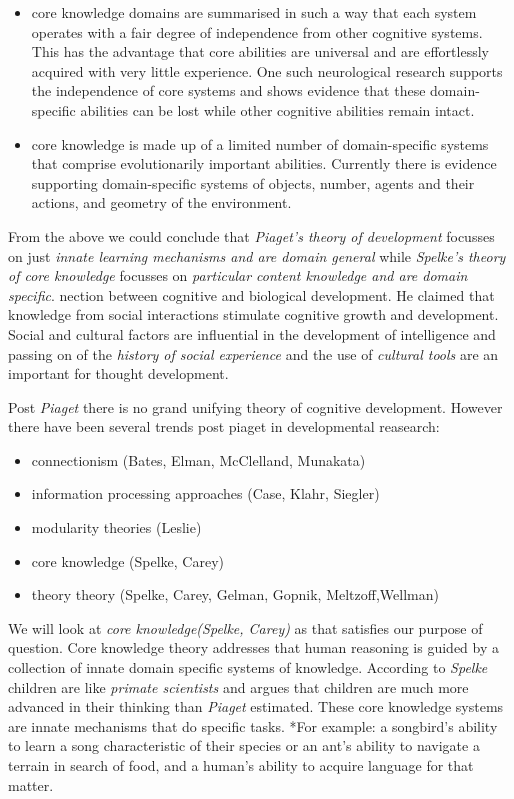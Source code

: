 \documentclass[11pt]{article}
\providecommand{\tightlist}{%
      \setlength{\itemsep}{0pt}\setlength{\parskip}{0pt}}
\begin{document}
\begin{itemize}
\item
  core knowledge domains are summarised in such a way that each system
  operates with a fair degree of independence from other cognitive
  systems. This has the advantage that core abilities are universal and
  are effortlessly acquired with very little experience. One such
  neurological research supports the independence of core systems and
  shows evidence that these domain-specific abilities can be lost while
  other cognitive abilities remain intact.
\item
  core knowledge is made up of a limited number of domain-specific
  systems that comprise evolutionarily important abilities. Currently
  there is evidence supporting domain-specific systems of objects,
  number, agents and their actions, and geometry of the environment.
\end{itemize}

From the above we could conclude that \emph{Piaget's theory of
development} focusses on just \emph{innate learning mechanisms and are
domain general} while \emph{Spelke's theory of core knowledge} focusses
on \emph{particular content knowledge and are domain specific}. nection
between cognitive and biological development. He claimed that knowledge
from social interactions stimulate cognitive growth and development.
Social and cultural factors are influential in the development of
intelligence and passing on of the \emph{history of social experience}
and the use of \emph{cultural tools} are an important for thought
development.

    Post \emph{Piaget} there is no grand unifying theory of cognitive
development. However there have been several trends post piaget in
developmental reasearch:

\begin{itemize}
\tightlist
\item
  connectionism (Bates, Elman, McClelland, Munakata)
\item
  information processing approaches (Case, Klahr, Siegler)
\item
  modularity theories (Leslie)
\item
  core knowledge (Spelke, Carey)
\item
  theory theory (Spelke, Carey, Gelman, Gopnik, Meltzoff,Wellman)
\end{itemize}

We will look at \emph{core knowledge(Spelke, Carey)} as that satisfies
our purpose of question. Core knowledge theory addresses that human
reasoning is guided by a collection of innate domain specific systems of
knowledge. According to \emph{Spelke} children are like \emph{primate
scientists} and argues that children are much more advanced in their
thinking than \emph{Piaget} estimated. These core knowledge systems are
innate mechanisms that do specific tasks. *For example: a songbird's
ability to learn a song characteristic of their species or an ant's
ability to navigate a terrain in search of food, and a human's ability
to acquire language for that matter.
\end{document}
